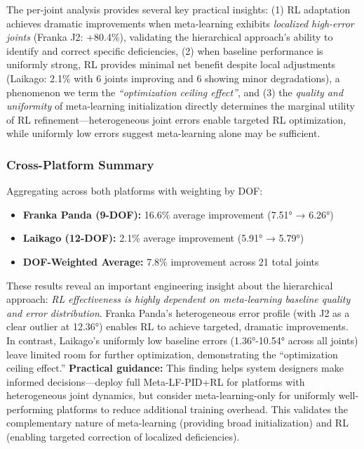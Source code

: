\documentclass[a4paper]{cas-sc}
\begin{document}
The per-joint analysis provides several key practical insights: (1) RL adaptation achieves dramatic improvements when meta-learning exhibits \textit{localized high-error joints} (Franka J2: +80.4\%), validating the hierarchical approach's ability to identify and correct specific deficiencies, (2) when baseline performance is uniformly strong, RL provides minimal net benefit despite local adjustments (Laikago: 2.1\% with 6 joints improving and 6 showing minor degradations), a phenomenon we term the \textit{``optimization ceiling effect''}, and (3) the \textit{quality and uniformity} of meta-learning initialization directly determines the marginal utility of RL refinement—heterogeneous joint errors enable targeted RL optimization, while uniformly low errors suggest meta-learning alone may be sufficient.

\subsubsection{Cross-Platform Summary}

Aggregating across both platforms with weighting by DOF:
\begin{itemize}
    \item \textbf{Franka Panda (9-DOF):} 16.6\% average improvement (7.51° → 6.26°)
    \item \textbf{Laikago (12-DOF):} 2.1\% average improvement (5.91° → 5.79°)
    \item \textbf{DOF-Weighted Average:} 7.8\% improvement across 21 total joints
\end{itemize}

These results reveal an important engineering insight about the hierarchical approach: \textit{RL effectiveness is highly dependent on meta-learning baseline quality and error distribution}. Franka Panda's heterogeneous error profile (with J2 as a clear outlier at 12.36°) enables RL to achieve targeted, dramatic improvements. In contrast, Laikago's uniformly low baseline errors (1.36°-10.54° across all joints) leave limited room for further optimization, demonstrating the ``optimization ceiling effect.'' \textbf{Practical guidance:} This finding helps system designers make informed decisions—deploy full Meta-LF-PID+RL for platforms with heterogeneous joint dynamics, but consider meta-learning-only for uniformly well-performing platforms to reduce additional training overhead. This validates the complementary nature of meta-learning (providing broad initialization) and RL (enabling targeted correction of localized deficiencies).
\end{document}
